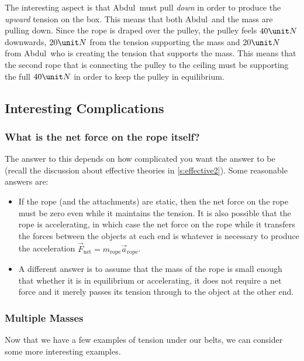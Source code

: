 \documentclass[11pt,letter,openany,makeidx]{book}
\newcommand{\mautoreturn}[1]{\note{Return to \protect{\autoref{#1}}.}}
\newcommand{\studentA}{Abdul}       \newcommand{\massA}{\mbox{$85.0\unit{kg}$}}
\begin{document}
\noindent
The interesting aspect is that \studentA\ must pull \textit{down} in order to produce the \textit{upward} tension on the box.  This means that both \studentA\ and the mass are pulling down.  Since the rope is draped over the pulley, the pulley feels $40\unit N$ downwards, $20\unit N$ from the tension supporting the mass and $20\unit N$ from \studentA\ who is creating the tension that supports the mass.  This means that the second rope that is connecting the pulley to the ceiling must be supporting the full $40\unit N$ in order to keep the pulley in equilibrium.



\subsection{Interesting Complications}

\subsubsection{What is the net force on the rope itself?}  
The answer to this depends on how complicated you want the answer to be (recall the discussion about effective theories in \autoref{s:effective2}).  Some reasonable answers are:
\begin{itemize}
\item If the rope (and the attachments) are static, then the net force on the rope must be zero even while it maintains the tension.  It is also possible that the rope is accelerating, in which case the net force on the rope while it transfers the forces between the objects at each end is whatever is necessary to produce the acceleration $\vec F_\mathrm{net} = m_\mathrm{rope} \vec a_\mathrm{rope}$.
\item A different answer is to assume that the mass of the rope is small enough that whether it is in equilibrium or accelerating, it does not require a net force and it merely passes its tension through to the object at the other end.
\end{itemize}

\subsubsection{Multiple Masses}\label{sss:multiple.mass}\mautoreturn{ss:tension.support}

Now that we have a few examples of tension under our belts, we can consider some more interesting examples.
\end{document}
